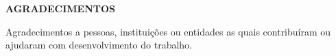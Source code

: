 \begin{newpage}
	\thispagestyle{empty}	
	\setlength{\parindent}{1.25cm} %
	\setlength{\baselineskip}{1.5\baselineskip} %
	\begin{center}
		\textbf{AGRADECIMENTOS} \\ [1.5\baselineskip]
	\end{center}
	
Agradecimentos a pessoas, instituições ou entidades as quais contribuíram ou ajudaram com  desenvolvimento do trabalho.

\end{newpage}